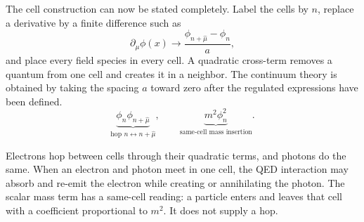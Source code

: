 \begin{classroomqa}
\end{classroomqa}

The cell construction can now be stated completely. Label the cells by \(n\), replace a derivative by a finite difference such as
\begin{equation}
\partial_\mu\phi(x)
\longrightarrow
\frac{\phi_{n+\hat\mu}-\phi_n}{a},
\end{equation}
and place every field species in every cell. A quadratic cross-term removes a quantum from one cell and creates it in a neighbor. The continuum theory is obtained by taking the spacing \(a\) toward zero after the regulated expressions have been defined.
\begin{equation}
\underbrace{\phi_n\phi_{n+\hat\mu}}_{\text{hop }n\leftrightarrow n+\hat\mu},
\qquad
\underbrace{m^2\phi_n^2}_{\text{same-cell mass insertion}}.
\end{equation}

\begin{classroomqa}
\end{classroomqa}

Electrons hop between cells through their quadratic terms, and photons do the same. When an electron and photon meet in one cell, the QED interaction may absorb and re-emit the electron while creating or annihilating the photon. The scalar mass term has a same-cell reading: a particle enters and leaves that cell with a coefficient proportional to \(m^2\). It does not supply a hop.

\begin{classroomqa}
\end{classroomqa}

